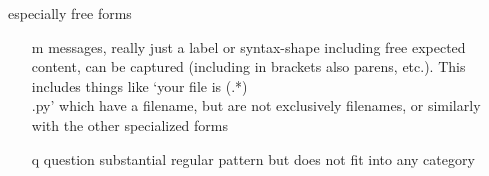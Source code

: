 especially free forms
\begin{itemize}
\item[ m ] messages, really just a label or syntax-shape including free expected content, can be captured (including in brackets also parens, etc.).  This includes things like `your file is (.*)\\.py' which have a filename, but are not exclusively filenames, or similarly with the other specialized forms
\item[ q ] question    substantial regular pattern but does not fit into any category
\end{itemize}
































